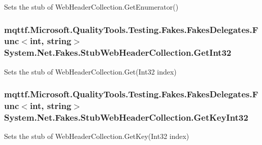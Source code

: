 Sets the stub of Web\-Header\-Collection.\-Get\-Enumerator()

\hypertarget{class_system_1_1_net_1_1_fakes_1_1_stub_web_header_collection_a1e993cdccda1989f323dd47be9dda520}{
\subsubsection[{Get\-Int32}]{\setlength{\rightskip}{0pt plus 5cm}mqttf.\-Microsoft.\-Quality\-Tools.\-Testing.\-Fakes.\-Fakes\-Delegates.\-Func$<$int, string$>$ System.\-Net.\-Fakes.\-Stub\-Web\-Header\-Collection.\-Get\-Int32}}\label{class_system_1_1_net_1_1_fakes_1_1_stub_web_header_collection_a1e993cdccda1989f323dd47be9dda520}


Sets the stub of Web\-Header\-Collection.\-Get(\-Int32 index)

\hypertarget{class_system_1_1_net_1_1_fakes_1_1_stub_web_header_collection_ab5edba684e07486346f845a4c1b9e350}{
\subsubsection[{Get\-Key\-Int32}]{\setlength{\rightskip}{0pt plus 5cm}mqttf.\-Microsoft.\-Quality\-Tools.\-Testing.\-Fakes.\-Fakes\-Delegates.\-Func$<$int, string$>$ System.\-Net.\-Fakes.\-Stub\-Web\-Header\-Collection.\-Get\-Key\-Int32}}\label{class_system_1_1_net_1_1_fakes_1_1_stub_web_header_collection_ab5edba684e07486346f845a4c1b9e350}


Sets the stub of Web\-Header\-Collection.\-Get\-Key(\-Int32 index)


